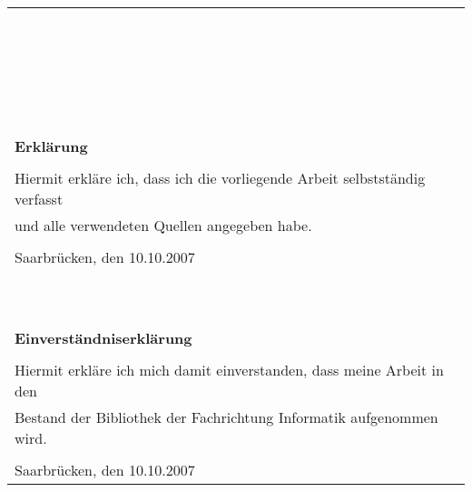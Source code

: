 \begin{titlepage}
\pagebreak


\pagestyle{empty}

\begin{flushleft}
  \begin{tabular}{l}
    \\\\\\\\\\\\\\\\
    \\\\\\\\\\\\\\\\
    \\\\\\\\\\\\\\\\
    {\Large{\bf Erkl\"arung}}\\\\
    {\Large{Hiermit erkl\"are ich, dass ich die vorliegende Arbeit
    selbstst\"andig verfasst}} \\
    {\Large und alle verwendeten Quellen angegeben habe.}\\\\
    {\Large{Saarbr\"ucken, den 10.10.2007}}\\\\\\\\\\\\\\\\\\\\\\

    {\Large{\bf Einverst\"andniserkl\"arung}}\\\\
    {\Large{Hiermit erkl\"are ich mich damit einverstanden, dass meine
        Arbeit in den}} \\
    {\Large Bestand der Bibliothek der Fachrichtung Informatik aufgenommen wird.}\\\\
    {\Large{Saarbr\"ucken, den 10.10.2007}}


\end{tabular}
\end{flushleft}
\end{titlepage}
